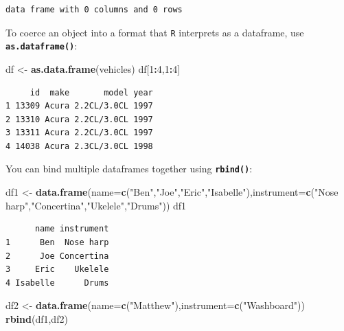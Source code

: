 \documentclass[
]{book}
\newenvironment{Shaded}{\begin{snugshade}}{\end{snugshade}}
\newcommand{\DataTypeTok}[1]{\textcolor[rgb]{0.13,0.29,0.53}{#1}}
\newcommand{\DecValTok}[1]{\textcolor[rgb]{0.00,0.00,0.81}{#1}}
\newcommand{\KeywordTok}[1]{\textcolor[rgb]{0.13,0.29,0.53}{\textbf{#1}}}
\newcommand{\NormalTok}[1]{#1}
\newcommand{\OperatorTok}[1]{\textcolor[rgb]{0.81,0.36,0.00}{\textbf{#1}}}
\newcommand{\StringTok}[1]{\textcolor[rgb]{0.31,0.60,0.02}{#1}}
\begin{document}
\begin{verbatim}
data frame with 0 columns and 0 rows
\end{verbatim}

To coerce an object into a format that \texttt{R} interprets as a dataframe, use \textbf{\texttt{as.dataframe()}}:

\begin{Shaded}
\begin{Highlighting}[]
\NormalTok{df <-}\StringTok{ }\KeywordTok{as.data.frame}\NormalTok{(vehicles)}
\NormalTok{df[}\DecValTok{1}\OperatorTok{:}\DecValTok{4}\NormalTok{,}\DecValTok{1}\OperatorTok{:}\DecValTok{4}\NormalTok{]}
\end{Highlighting}
\end{Shaded}

\begin{verbatim}
     id  make       model year
1 13309 Acura 2.2CL/3.0CL 1997
2 13310 Acura 2.2CL/3.0CL 1997
3 13311 Acura 2.2CL/3.0CL 1997
4 14038 Acura 2.3CL/3.0CL 1998
\end{verbatim}

You can bind multiple dataframes together using \textbf{\texttt{rbind()}}:

\begin{Shaded}
\begin{Highlighting}[]
\NormalTok{df1 <-}\StringTok{ }\KeywordTok{data.frame}\NormalTok{(}\DataTypeTok{name=}\KeywordTok{c}\NormalTok{(}\StringTok{"Ben"}\NormalTok{,}\StringTok{"Joe"}\NormalTok{,}\StringTok{"Eric"}\NormalTok{,}\StringTok{"Isabelle"}\NormalTok{),}\DataTypeTok{instrument=}\KeywordTok{c}\NormalTok{(}\StringTok{"Nose harp"}\NormalTok{,}\StringTok{"Concertina"}\NormalTok{,}\StringTok{"Ukelele"}\NormalTok{,}\StringTok{"Drums"}\NormalTok{))}
\NormalTok{df1}
\end{Highlighting}
\end{Shaded}

\begin{verbatim}
      name instrument
1      Ben  Nose harp
2      Joe Concertina
3     Eric    Ukelele
4 Isabelle      Drums
\end{verbatim}

\begin{Shaded}
\begin{Highlighting}[]
\NormalTok{df2 <-}\StringTok{ }\KeywordTok{data.frame}\NormalTok{(}\DataTypeTok{name=}\KeywordTok{c}\NormalTok{(}\StringTok{"Matthew"}\NormalTok{),}\DataTypeTok{instrument=}\KeywordTok{c}\NormalTok{(}\StringTok{"Washboard"}\NormalTok{))}
\KeywordTok{rbind}\NormalTok{(df1,df2)}
\end{Highlighting}
\end{Shaded}
\end{document}
